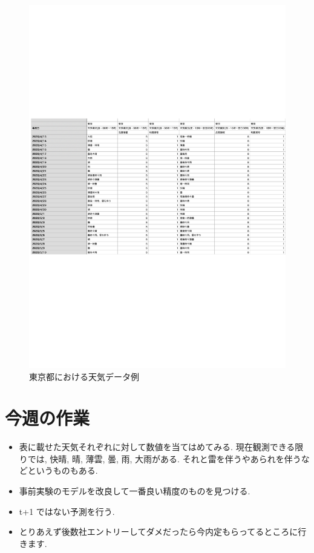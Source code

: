 \begin{figure}[phb]
\centering
\includegraphics[scale=0.8]{exe_wether.pdf}
\caption{東京都における天気データ例}
\end{figure}


\section{今週の作業}
\begin{itemize}
        \item 表に載せた天気それぞれに対して数値を当てはめてみる. 現在観測できる限りでは, 快晴, 晴, 薄雲, 曇, 雨, 大雨がある. それと雷を伴うやあられを伴うなどというものもある.
        \item 事前実験のモデルを改良して一番良い精度のものを見つける.
        \item t+1 ではない予測を行う.
        \item とりあえず後数社エントリーしてダメだったら今内定もらってるところに行きます.
\end{itemize}

